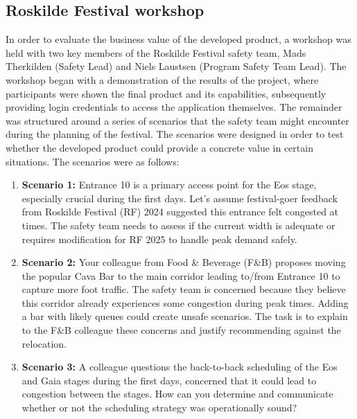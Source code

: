 


\subsection{Roskilde Festival workshop}
\label{sec:business-value}

In order to evaluate the business value of the developed product, a workshop was held with two key members of the Roskilde Festival safety team, Mads Therkilden (Safety Lead) and Niels Laustsen (Program Safety Team Lead). The workshop began with a demonstration of the results of the project, where participants were shown the final product and its capabilities, subsequently providing login credentials to access the application themselves. The remainder was structured around a series of scenarios that the safety team might encounter during the planning of the festival. The scenarios were designed in order to test whether the developed product could provide a concrete value in certain situations. The scenarios were as follows:

\begin{enumerate}
  \item \textbf{Scenario 1:} Entrance 10 is a primary access point for the Eos stage, especially crucial during the first days. Let's assume festival-goer feedback from Roskilde Festival (RF) 2024 suggested this entrance felt congested at times. The safety team needs to assess if the current width is adequate or requires modification for RF 2025 to handle peak demand safely.
  \item \textbf{Scenario 2:} Your colleague from Food \& Beverage (F\&B) proposes moving the popular Cava Bar to the main corridor leading to/from Entrance 10 to capture more foot traffic. The safety team is concerned because they believe this corridor already experiences some congestion during peak times. Adding a bar with likely queues could create unsafe scenarios. The task is to explain to the F\&B colleague these concerns and justify recommending against the relocation.
  \item \textbf{Scenario 3:} A colleague questions the back-to-back scheduling of the Eos and Gaia stages during the first days, concerned that it could lead to congestion between the stages. How can you determine and communicate whether or not the scheduling strategy was operationally sound?
\end{enumerate}

